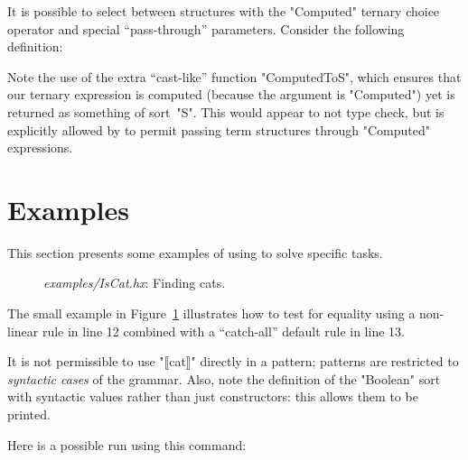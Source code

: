 \documentclass[11pt]{article} %
\newenvironment{figureunit}[1][]{\def\figureunitcaption{#1}}{\figureunitcaption}
\renewenvironment{figureunit}[1][]{\def\thefigureunitcaption{#1}%
  \begin{lrbox}{\savedfigureunit}\begin{minipage}{\linewidth}}%
{\thefigureunitcaption\vspace{1ex}\end{minipage}\end{lrbox}%
  \colorbox{blue!10}{\usebox{\savedfigureunit}}}
\begin{document}
\begin{example}
  It is possible to select between structures with the "Computed" ternary choice operator and
  special ``pass-through'' parameters. Consider the following definition:
  Note the use of the extra ``cast-like'' function "ComputedToS", which ensures that our ternary
  expression is computed (because the argument is "Computed") yet is returned as something of
  sort~"S". This would appear to not type check, but is explicitly allowed by \HAX to permit passing
  term structures through "Computed" expressions.
\end{example}


\section{Examples}
\label{sec:examples}

This section presents some examples of using \HAX to solve specific tasks.

\begin{figure}[h]
  \begin{figureunit}[
      \caption{\emph{examples/IsCat.hx}: Finding cats.}
      \label{fig:cats}
    ]
  \end{figureunit}
\end{figure}

\begin{example}
  The small example in Figure~\ref{fig:cats} illustrates how to test for equality using a
  non-linear rule in line 12 combined with a ``catch-all'' default rule in line 13.

  It is not permissible to use "⟦cat⟧" directly in a pattern; patterns are restricted to
  \emph{syntactic cases} of the grammar. Also, note the definition of the "Boolean" sort with
  syntactic values rather than just constructors: this allows them to be printed.

  Here is a possible run using this command:
\end{example}
\end{document}
